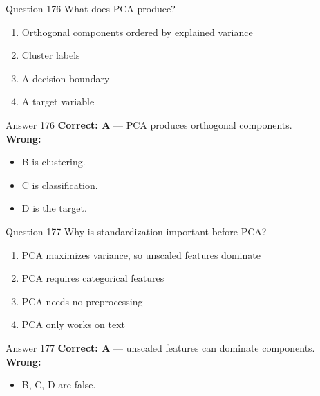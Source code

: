 \documentclass[aspectratio=169,11pt]{beamer}
\begin{document}
	\begin{frame}{Question 176}
		What does PCA produce?
		\begin{enumerate}[label=\Alph*.]
			\item Orthogonal components ordered by explained variance
			\item Cluster labels
			\item A decision boundary
			\item A target variable
		\end{enumerate}
	\end{frame}
	\begin{frame}{Answer 176}
		\textbf{Correct: A} --- PCA produces orthogonal components.\\
		\vspace{0.5em}
		\textbf{Wrong:}
		\begin{itemize}
			\item B is clustering.
			\item C is classification.
			\item D is the target.
		\end{itemize}
	\end{frame}
	
	\begin{frame}{Question 177}
		Why is standardization important before PCA?
		\begin{enumerate}[label=\Alph*.]
			\item PCA maximizes variance, so unscaled features dominate
			\item PCA requires categorical features
			\item PCA needs no preprocessing
			\item PCA only works on text
		\end{enumerate}
	\end{frame}
	\begin{frame}{Answer 177}
		\textbf{Correct: A} --- unscaled features can dominate components.\\
		\vspace{0.5em}
		\textbf{Wrong:}
		\begin{itemize}
			\item B, C, D are false.
		\end{itemize}
	\end{frame}
	
\end{document}

